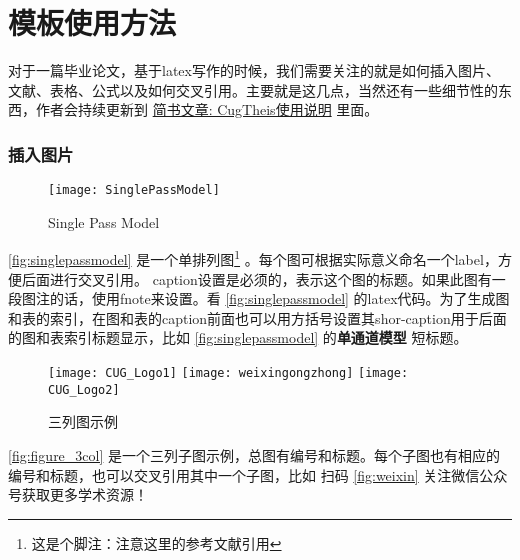 
\chapter{模板使用方法}

对于一篇毕业论文，基于latex写作的时候，我们需要关注的就是如何插入图片、文献、表格、公式以及如何交叉引用。主要就是这几点，当然还有一些细节性的东西，作者会持续更新到 \href{https://www.jianshu.com/p/c9bb775fe0f4}{简书文章: CugTheis使用说明}  里面。

\subsection{插入图片}
\begin{figure} [htbp] 
	\centering
	\texttt{[image: SinglePassModel]} 
	\caption[单通道模型]{Single Pass Model} 
	\label{fig:singlepassmodel} 
\end{figure} 

 \autoref{fig:singlepassmodel} 是一个单排列图\footnote{这是个脚注：注意这里的参考文献引用}
  \citep{andersen2017faulting}。每个图可根据实际意义命名一个label，方便后面进行交叉引用。
  caption设置是必须的，表示这个图的标题。如果此图有一段图注的话，使用fnote来设置。看 \autoref{fig:singlepassmodel} 的latex代码。为了生成图和表的索引，在图和表的caption前面也可以用方括号设置其shor-caption用于后面的图和表索引标题显示，比如  \autoref{fig:singlepassmodel} 的\textbf{单通道模型} 短标题。


\begin{figure} [htbp]
	\centering%
	{\texttt{[image: CUG\_Logo1]} } 
	\hspace{0.01\textwidth} 
	{\texttt{[image: weixingongzhong]} } 
		\hspace{0.01\textwidth} 
	{\texttt{[image: CUG\_Logo2]} } 
	\caption{三列图示例} 
	\label{fig:figure_3col} 
\end{figure} 

\autoref{fig:figure_3col} 是一个三列子图示例，总图有编号和标题。每个子图也有相应的编号和标题，也可以交叉引用其中一个子图，比如 扫码 \ref{fig:weixin} 关注微信公众号获取更多学术资源！


